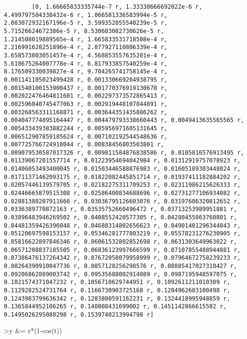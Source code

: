 \documentclass[
]{book}
\begin{document}
\begin{verbatim}
        [0, 1.66665833335744e-7 r, 1.33330666692022e-6 r, 
4.499797504338432e-6 r, 1.066581336583994e-5 r, 
2.083072932167196e-5 r, 3.599352055540239e-5 r, 
5.71526624672386e-5 r, 8.530603082730626e-5 r, 
1.214508019889565e-4 r, 1.665833531718508e-4 r, 
2.216991628251896e-4 r, 2.877927110806339e-4 r, 
3.658573803051457e-4 r, 4.568853557635201e-4 r, 
5.618675264007778e-4 r, 6.817933857540259e-4 r, 
8.176509330039827e-4 r, 9.704265741758145e-4 r, 
0.001141105023499428 r, 0.001330669204938795 r, 
0.001540100153900437 r, 0.001770376919130678 r, 
0.002022476464811601 r, 0.002297373572865413 r, 
0.002596040745477063 r, 0.002919448107844891 r, 
0.003268563311168871 r, 0.003644351435886262 r, 
0.004047774895164447 r, 0.004479793338660443 r, 0.0049413635565565 r, 
0.005433439383882244 r, 0.005956971605131645 r, 
0.006512907859185624 r, 0.007102192544548636 r, 
0.007725766724910044 r, 0.00838456803503801 r, 
0.009079530587017326 r, 0.009811584876838586 r, 0.0105816576913495 r, 
0.01139067201557714 r, 0.01223954694042984 r, 0.01312919757078923 r, 
0.01406053493400045 r, 0.01503446588876983 r, 0.01605189303448024 r, 
0.01711371462093175 r, 0.01822082445851714 r, 0.01937411182884202 r, 
0.02057446139579705 r, 0.02182275311709253 r, 0.02311986215626333 r, 
0.02446665879515308 r, 0.02586400834688696 r, 0.02731277106934082 r, 
0.02881380207911666 r, 0.03036795126603076 r, 0.03197606320812652 r, 
0.0336389770872163 r, 0.03535752660496472 r, 0.03713253989951881 r, 
0.03896483946269502 r, 0.0408552420577305 r, 0.04280455863760801 r, 
0.04481359426396048 r, 0.04688314802656623 r, 0.04901401296344043 r, 
0.05120697598153157 r, 0.05346281777803219 r, 0.05578231276230905 r, 
0.05816622897846346 r, 0.06061532802852698 r, 0.0631303649963022 r, 
0.06571208837185505 r, 0.06836123997666599 r, 0.07107855488944881 r, 
0.07386476137264342 r, 0.07672058079958999 r, 0.07964672758239233 r, 
0.08264390910047736 r, 0.0857128256298576 r, 0.08885417027310427 r, 
0.09206862889003742 r, 0.09535688002914089 r, 0.0987195948597075 r, 
0.1021574371047232 r, 0.1056710629744951 r, 0.1092611211010309 r, 
0.1129282524731764 r, 0.1166730903725168 r, 0.1204962603100498 r, 
0.1243983799636342 r, 0.1283800591162231 r, 0.1324418995948859 r, 
0.1365844952106265 r, 0.140808431699002 r, 0.1451142866615502 r, 
0.1495026295080298 r, 0.1539740213994798 r]    
\end{verbatim}

\textgreater y \&= r*(1-cos(t))
\end{document}
